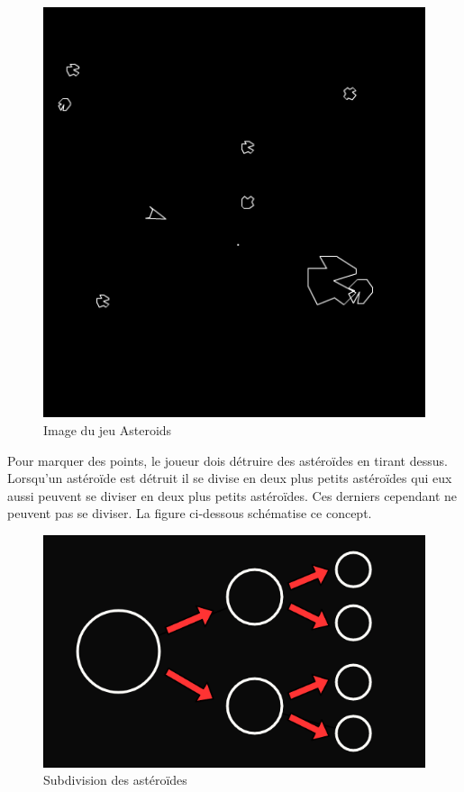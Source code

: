 \documentclass{article}
\begin{document}
\begin{figure}[H]
\begin{center}
	\includegraphics[scale=0.6]{game.png}
	\caption{Image du jeu Asteroids}
\end{center}
\end{figure}

Pour marquer des points, le joueur dois détruire des astéroïdes en tirant dessus. Lorsqu'un astéroïde est détruit il se divise en deux plus petits astéroïdes qui eux aussi peuvent se diviser en deux plus petits astéroïdes. Ces derniers cependant ne peuvent pas se diviser. La figure ci-dessous schématise ce concept.

\begin{figure}[H]
\begin{center}
	\includegraphics[scale=0.3]{asteroids.png}
	\caption{Subdivision des astéroïdes}
\end{center}
\end{figure}
\end{document}
